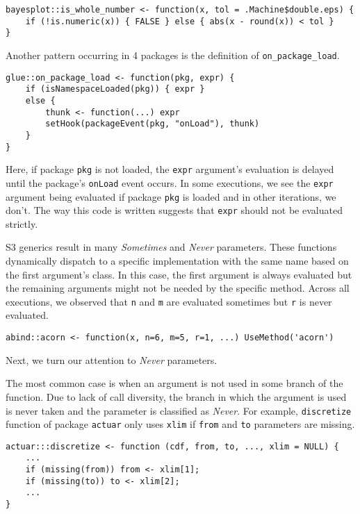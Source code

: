 \documentclass[review,nonacm,screen,acmsmall,anonymous=true]{acmart}
\newcommand{\sometimes}{\emph{Sometimes}\xspace}
\newcommand{\never}{\emph{Never}\xspace}
\newcommand{\code}[1]{\lstinline |#1|\xspace}
\begin{document}
\begin{lstlisting}
bayesplot::is_whole_number <- function(x, tol = .Machine$double.eps) {
    if (!is.numeric(x)) { FALSE } else { abs(x - round(x)) < tol }
}
\end{lstlisting}


Another pattern occurring in 4 packages is the definition of
\code{on_package_load}.

\begin{lstlisting}
glue::on_package_load <- function(pkg, expr) {
    if (isNamespaceLoaded(pkg)) { expr }
    else {
        thunk <- function(...) expr
        setHook(packageEvent(pkg, "onLoad"), thunk)
    }
}
\end{lstlisting}

Here, if package \code{pkg} is not loaded, the \code{expr} argument's evaluation
is delayed until the package's \code{onLoad} event occurs. In some executions,
we see the \code{expr} argument being evaluated if package \code{pkg} is loaded
and in other iterations, we don't. The way this code is written suggests that
\code{expr} should not be evaluated strictly.

S3 generics result in many \sometimes and \never parameters. These functions
dynamically dispatch to a specific implementation with the same name based on
the first argument's class. In this case, the first argument is always evaluated
but the remaining arguments might not be needed by the specific method. Across
all executions, we observed that \code{n} and \code{m} are evaluated sometimes
but \code{r} is never evaluated.

\begin{lstlisting}
abind::acorn <- function(x, n=6, m=5, r=1, ...) UseMethod('acorn')
\end{lstlisting}


Next, we turn our attention to \never parameters.

The most common case is when an argument is not used in some branch of the
function. Due to lack of call diversity, the branch in which the argument is
used is never taken and the parameter is classified as \never. For example,
\code{discretize} function of package \code{actuar} only uses \code{xlim} if
\code{from} and \code{to} parameters are missing.
\begin{lstlisting}
actuar:::discretize <- function (cdf, from, to, ..., xlim = NULL) {
    ...
    if (missing(from)) from <- xlim[1];
    if (missing(to)) to <- xlim[2];
    ...
}
\end{lstlisting}
\end{document}
